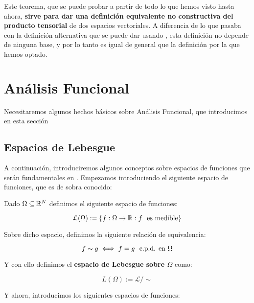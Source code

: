 Este teorema, que se puede probar a partir de todo lo que hemos visto hasta ahora, \textbf{sirve para dar una definición equivalente no constructiva del producto tensorial} de dos espacios vectoriales. A diferencia de lo que pasaba con la definición alternativa que se puede dar usando , esta definición no depende de ninguna base, y por lo tanto es igual de general que la definición por la que hemos optado.

\section{Análisis Funcional} \label{sec:preliminares_funcional}

Necesitaremos algunos hechos básicos sobre Análisis Funcional, que introducimos en esta sección

\subsection{Espacios de Lebesgue}

A continuación, introduciremos algunos conceptos sobre espacios de funciones que serán fundamentales en . Empezamos introduciendo el siguiente espacio de funciones, que es de sobra conocido:

\begin{definicion}

    Dado $\Omega \subseteq \mathbb{R}^N$ definimos el siguiente espacio de funciones:

    \begin{equation}
        \mathcal{L}(\Omega) := \{f: \Omega \to \mathbb{R} : f \ \  \text{es medible} \}
    \end{equation}

    Sobre dicho espacio, definimos la siguiente relación de equivalencia:

    \begin{equation}
        f \sim g \iff f = g \ \  \text{c.p.d. en } \Omega
    \end{equation}

    Y con ello definimos el \textbf{espacio de Lebesgue sobre $\Omega$} como:

    \begin{equation}
        L(\Omega) := \mathcal{L} / \sim
    \end{equation}
\end{definicion}

Y ahora, introducimos los siguientes espacios de funciones:


